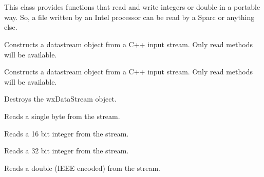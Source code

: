 \section{}\label{wxdatastream}

This class provides functions that read and write integers or double in a
portable way. So, a file written by an Intel processor can be read by a
Sparc or anything else.


\label{wxdatastreamconstr}


Constructs a datastream object from a C++ input stream. Only read methods will
be available.




Constructs a datastream object from a C++ input stream. Only read methods will
be available.





Destroys the wxDataStream object.



Reads a single byte from the stream.



Reads a 16 bit integer from the stream.



Reads a 32 bit integer from the stream.



Reads a double (IEEE encoded) from the stream.

